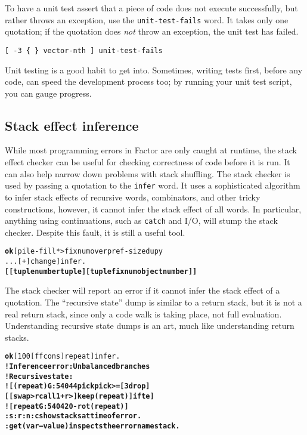 \documentclass{book}
\begin{document}
To have a unit test assert that a piece of code does not execute successfully, but rather throws an exception, use the \texttt{unit-test-fails} word. It takes only one quotation; if the quotation does \emph{not} throw an exception, the unit test has failed.

\begin{verbatim}
[ -3 { } vector-nth ] unit-test-fails
\end{verbatim}

Unit testing is a good habit to get into. Sometimes, writing tests first, before any code, can speed the development process too; by running your unit test script, you can gauge progress.

\subsection{Stack effect inference}

While most programming errors in Factor are only caught at runtime, the stack effect checker can be useful for checking correctness of code before it is run. It can also help narrow down problems with stack shuffling. The stack checker is used by passing a quotation to the \texttt{infer} word. It uses a sophisticated algorithm to infer stack effects of recursive words, combinators, and other tricky constructions, however, it cannot infer the stack effect of all words. In particular, anything using continuations, such as \texttt{catch} and I/O, will stump the stack checker. Despite this fault, it is still a useful tool.

\begin{alltt}
\textbf{ok} [ pile-fill * >fixnum over pref-size dup y
\texttt{...} [ + ] change ] infer .
\textbf{[ [ tuple number tuple ] [ tuple fixnum object number ] ]}
\end{alltt}

The stack checker will report an error if it cannot infer the stack effect of a quotation. The ``recursive state'' dump is similar to a return stack, but it is not a real return stack, since only a code walk is taking place, not full evaluation. Understanding recursive state dumps is an art, much like understanding return stacks.

\begin{alltt}
\textbf{ok} [ 100 [ f f cons ] repeat ] infer .
\textbf{! Inference error: Unbalanced branches
! Recursive state:
! [ (repeat) G:54044 pick pick >= [ 3drop ]
    [ [ swap >r call 1 + r> ] keep (repeat) ] ifte ]
! [ repeat G:54042 0 -rot (repeat) ]
:s :r :n :c show stacks at time of error.
:get ( var -- value ) inspects the error namestack.}
\end{alltt}
\end{document}
